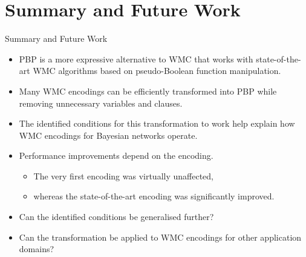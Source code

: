 \documentclass{beamer}
\begin{document}
\section{Summary and Future Work}

\begin{frame}{Summary and Future Work}
  \begin{itemize}
  \item PBP is a more expressive alternative to WMC that works with
    state-of-the-art WMC algorithms based on pseudo-Boolean function
    manipulation.
  \item Many WMC encodings can be efficiently transformed into PBP while
    removing unnecessary variables and clauses.
  \item The identified conditions for this transformation to work help explain
    how WMC encodings for Bayesian networks operate.
  \item Performance improvements depend on the encoding.
    \begin{itemize}
    \item The very first encoding was virtually unaffected,
    \item whereas the state-of-the-art encoding was significantly improved.
    \end{itemize}
  \item Can the identified conditions be generalised further?
  \item Can the transformation be applied to WMC encodings for other application
    domains?
  \end{itemize}
\end{frame}
\end{document}
